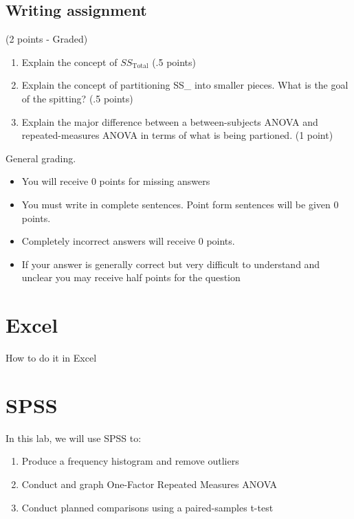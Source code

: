 \documentclass[
]{book}
\providecommand{\tightlist}{%
  \setlength{\itemsep}{0pt}\setlength{\parskip}{0pt}}
\begin{document}
\hypertarget{writing-assignment-6}{%
\subsection{Writing assignment}\label{writing-assignment-6}}

(2 points - Graded)

\begin{enumerate}
\def\labelenumi{\arabic{enumi}.}
\item
  Explain the concept of \(SS_\text{Total}\) (.5 points)
\item
  Explain the concept of partitioning SS\_ into smaller pieces. What is the goal of the spitting? (.5 points)
\item
  Explain the major difference between a between-subjects ANOVA and repeated-measures ANOVA in terms of what is being partioned. (1 point)
\end{enumerate}

General grading.

\begin{itemize}
\tightlist
\item
  You will receive 0 points for missing answers
\item
  You must write in complete sentences. Point form sentences will be given 0 points.
\item
  Completely incorrect answers will receive 0 points.
\item
  If your answer is generally correct but very difficult to understand and unclear you may receive half points for the question
\end{itemize}

\hypertarget{excel-8}{%
\section{Excel}\label{excel-8}}

How to do it in Excel

\hypertarget{spss-8}{%
\section{SPSS}\label{spss-8}}

In this lab, we will use SPSS to:

\begin{enumerate}
\def\labelenumi{\arabic{enumi}.}
\tightlist
\item
  Produce a frequency histogram and remove outliers
\item
  Conduct and graph One-Factor Repeated Measures ANOVA
\item
  Conduct planned comparisons using a paired-samples t-test
\end{enumerate}
\end{document}

